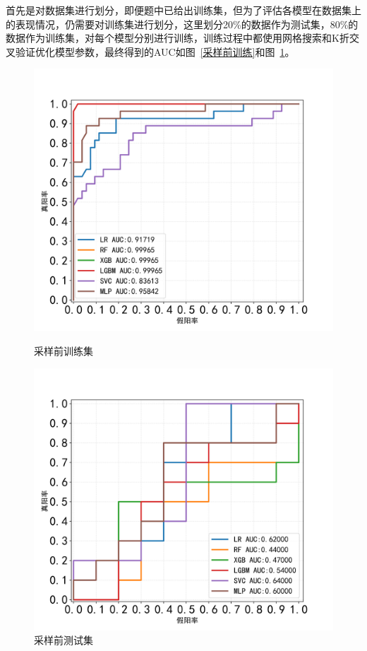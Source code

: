 \documentclass[bwprint]{gmcmthesis}
\begin{document}
首先是对数据集进行划分，即便题中已给出训练集，但为了评估各模型在数据集上的表现情况，仍需要对训练集进行划分，这里划分20\%的数据作为测试集，80\%的数据作为训练集，对每个模型分别进行训练，训练过程中都使用网格搜索和K折交叉验证优化模型参数，最终得到的AUC如图~\ref{采样前训练}和图~\ref{采样前测试}。

\begin{figure}
\centering
  \begin{minipage}{0.45\linewidth}
    \centering
    \includegraphics[width=\linewidth]{figures/q1_auc_train(采样前).png}
    \caption{采样前训练集}
    \label{采样前训练}
  \end{minipage}%
  \begin{minipage}{0.45\linewidth}
    \centering
    \includegraphics[width=\linewidth]{figures/q1_auc_test(采样前).png}
    \caption{采样前测试集}
    \label{采样前测试}
  \end{minipage}
\end{figure}
\end{document}
